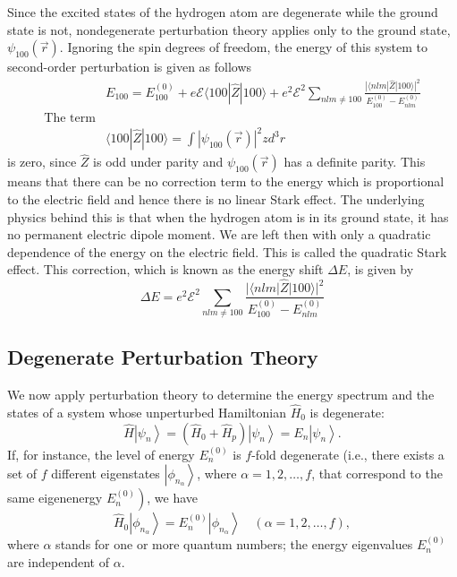 Since the excited states of the hydrogen atom are degenerate while the ground state is not, nondegenerate perturbation theory applies only to the ground state, $\psi_{100}(\vec{r})$. Ignoring the spin degrees of freedom, the energy of this system to second-order perturbation is given as follows
	$$
	\begin{aligned}
	&E_{100}=E_{100}^{(0)}+e \mathcal{E}\langle 100|\hat{Z}| 100\rangle+e^{2} \mathcal{E}^{2} \sum_{n l m \neq 100} \frac{|\langle n l m|\hat{Z}| 100\rangle|^{2}}{E_{100}^{(0)}-E_{n l m}^{(0)}}\\
	\text{The term}&\\
	&\langle 100|\hat{Z}| 100\rangle=\int\left|\psi_{100}(\vec{r})\right|^{2} z d^{3} r
\end{aligned}
$$
is zero, since $\hat{Z}$ is odd under parity and $\psi_{100}(\vec{r})$ has a definite parity. This means that there can be no correction term to the energy which is proportional to the electric field and hence there is no linear Stark effect. The underlying physics behind this is that when the hydrogen atom is in its ground state, it has no permanent electric dipole moment. We are left then with only a quadratic dependence of the energy  on the electric field. This is called the quadratic Stark effect. This correction, which is known as the energy shift $\Delta E$, is given by
$$
\Delta E=e^{2} \mathcal{E}^{2} \sum_{n l m \neq 100} \frac{|\langle n l m|\hat{Z}| 100\rangle|^{2}}{E_{100}^{(0)}-E_{n l m}^{(0)}}
$$
\subsection{Degenerate Perturbation Theory}
 We now apply perturbation theory to determine the energy spectrum and the states of a system whose unperturbed Hamiltonian $\hat{H}_{0}$ is degenerate:
$$
\hat{H}\left|\psi_{n}\right\rangle=\left(\hat{H}_{0}+\hat{H}_{p}\right)\left|\psi_{n}\right\rangle=E_{n}\left|\psi_{n}\right\rangle .
$$
If, for instance, the level of energy $E_{n}^{(0)}$ is $f$-fold degenerate (i.e., there exists a set of $f$ different eigenstates $\left|\phi_{n_{\alpha}}\right\rangle$, where $\alpha=1,2, \ldots, f$, that correspond to the same eigenenergy $\left.E_{n}^{(0)}\right)$, we have
$$
\hat{H}_{0}\left|\phi_{n_{\alpha}}\right\rangle=E_{n}^{(0)}\left|\phi_{n_{\alpha}}\right\rangle \quad(\alpha=1,2, \ldots, f),
$$
where $\alpha$ stands for one or more quantum numbers; the energy eigenvalues $E_{n}^{(0)}$ are independent of $\alpha$.

